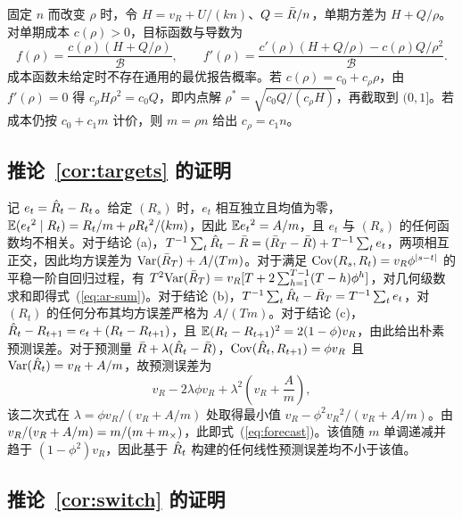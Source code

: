 固定 $n$ 而改变 $\rho$ 时，令 $H=v_R+U/(kn)$、$Q=\bar{R}/n$，单期方差为 $H+Q/\rho$。对单期成本 $c(\rho)>0$，目标函数与导数为
\begin{equation}
  f(\rho)=\frac{c(\rho)(H+Q/\rho)}{\mathcal{B}},\qquad
  f'(\rho)=\frac{c'(\rho)(H+Q/\rho)-c(\rho)Q/\rho^2}{\mathcal{B}}.
\end{equation}
成本函数未给定时不存在通用的最优报告概率。若 $c(\rho)=c_0+c_\rho\rho$，由 $f'(\rho)=0$ 得 $c_\rho H\rho^2=c_0Q$，即内点解 $\rho^*=\sqrt{c_0Q/(c_\rho H)}$，再截取到 $(0,1]$。若成本仍按 $c_0+c_1m$ 计价，则 $m=\rho n$ 给出 $c_\rho=c_1n$。

\subsection{推论~\ref{cor:targets} 的证明}
\label{app:cor-targets}

记 $e_t=\hat{R}_t-R_t$。给定 $(R_s)$ 时，$e_t$ 相互独立且均值为零，$\mathbb{E}(e_t{}^2\mid R_t)=R_t/m+\rho R_t{}^2/(km)$，因此 $\mathbb{E} e_t{}^2=A/m$，且 $e_t$ 与 $(R_s)$ 的任何函数均不相关。对于结论 (a)，$T^{-1}\sum_t\hat{R}_t-\bar{R}=(\bar{R}_T-\bar{R})+T^{-1}\sum_te_t$，两项相互正交，因此均方误差为 $\mathrm{Var}(\bar{R}_T)+A/(Tm)$。对于满足 $\mathrm{Cov}(R_s,R_t)=v_R\phi^{|s-t|}$ 的平稳一阶自回归过程，有 $T^2\mathrm{Var}(\bar{R}_T)=v_R[T+2\sum_{h=1}^{T-1}(T-h)\phi^h]$，对几何级数求和即得式~(\ref{eq:ar-sum})\citep{hamilton1994time}。对于结论 (b)，$T^{-1}\sum_t\hat{R}_t-\bar{R}_T=T^{-1}\sum_te_t$，对 $(R_t)$ 的任何分布其均方误差严格为 $A/(Tm)$。对于结论 (c)，$\hat{R}_t-R_{t+1}=e_t+(R_t-R_{t+1})$，且 $\mathbb{E}(R_t-R_{t+1})^2=2(1-\phi)v_R$，由此给出朴素预测误差。对于预测量 $\bar{R}+\lambda(\hat{R}_t-\bar{R})$，$\mathrm{Cov}(\hat{R}_t,R_{t+1})=\phi v_R$ 且 $\mathrm{Var}(\hat{R}_t)=v_R+A/m$，故预测误差为
\begin{equation}
  v_R-2\lambda\phi v_R+\lambda^2\left(v_R+\frac{A}{m}\right),
\end{equation}
该二次式在 $\lambda=\phi v_R/(v_R+A/m)$ 处取得最小值 $v_R-\phi^2v_R{}^2/(v_R+A/m)$。由 $v_R/(v_R+A/m)=m/(m+m_{\times})$，此即式~(\ref{eq:forecast})。该值随 $m$ 单调递减并趋于 $(1-\phi^2)v_R$，因此基于 $\hat{R}_t$ 构建的任何线性预测误差均不小于该值。

\subsection{推论~\ref{cor:switch} 的证明}
\label{app:cor1}

